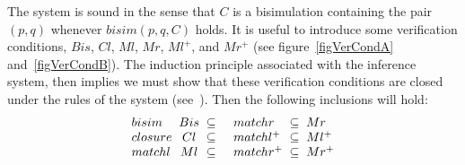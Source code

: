 The system is sound in the sense that $C$ is a bisimulation containing the pair $(p,q)$ whenever $bisim(p,q,C)$ holds. It is useful to introduce some verification conditions, $Bis$, $Cl$, $Ml$, $Mr$, $Ml^{+}$, and $Mr^{+}$ (see figure~\ref{figVerCondA} and~\ref{figVerCondB}). The induction principle associated with the inference system, then implies we must show that these verification conditions are closed under the rules of the system (see~\cite{Aczel}). Then the following inclusions will hold:
\[
\begin{array}{l@{\;\;}c@{\;\;\subseteq\;\;\;\;\;}l@{\;\;\subseteq\;\;}l}
bisim &  Bis & matchr &  Mr\\
closure & Cl & matchl^{+} & Ml^{+}\\
matchl  & Ml & matchr^{+} & Mr^{+}\\
\end{array}
\]
